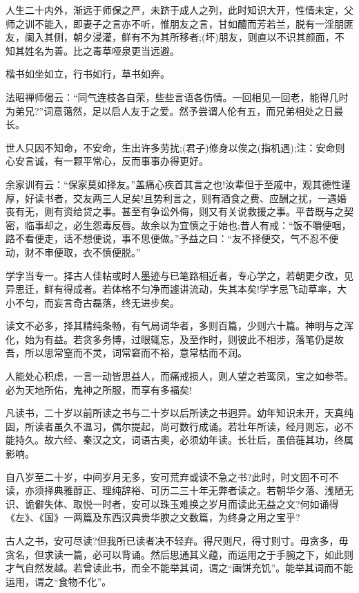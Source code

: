 \documentclass[letterpaper,10pt,english]{sphinxmanual}
\begin{document}
人生二十内外，渐远于师保之严，未跻于成人之列，此时知识大开，性情未定，父师之训不能入，即妻子之言亦不听，惟朋友之言，甘如醴而芳若兰，脱有一淫朋匪友，阑入其侧，朝夕浸灌，鲜有不为其所移者;(坏)朋友，则直以不识其颜面，不知其姓名为善。比之毒草哑泉更当远避。

楷书如坐如立，行书如行，草书如奔。

法昭禅师偈云：“同气连枝各自荣，些些言语各伤情。一回相见一回老，能得几时为弟兄?”词意蔼然，足以启人友于之爱。然予尝谓人伦有五，而兄弟相处之日最长。

世人只因不知命，不安命，生出许多劳扰;(君子)修身以俟之(指机遇);注：安命则心安言诚，有一颗平常心，反而事事办得更好。

余家训有云：“保家莫如择友。”盖痛心疾首其言之也!汝辈但于至戚中，观其德性谨厚，好读书者，交友两三人足矣!且势利言之，则有酒食之费、应酬之扰，一遇婚丧有无，则有资给贷之事。甚至有争讼外侮，则又有关说救援之事。平昔既与之契密，临事却之，必生怨毒反唇。故余以为宜慎之于始也;昔人有戒：“饭不嚼便咽，路不看便走，话不想便说，事不思便做。”予益之曰：“友不择便交，气不忍不便动，财不审便取，衣不慎便脱。”

学字当专一。择古人佳帖或时人墨迹与已笔路相近者，专心学之，若朝更夕改，见异思迁，鲜有得成者。若体格不匀净而遽讲流动，失其本矣!学字忌飞动草率，大小不匀，而妄言奇古磊落，终无进步矣。

读文不必多，择其精纯条畅，有气局词华者，多则百篇，少则六十篇。神明与之浑化，始为有益。若贪多务博，过眼辄忘，及至作时，则彼此不相涉，落笔仍是故吾，所以思常窒而不灵，词常窘而不裕，意常枯而不润。

人能处心积虑，一言一动皆思益人，而痛戒损人，则人望之若鸾凤，宝之如参苓。必为天地所佑，鬼神之所服，而享有多福矣!

凡读书，二十岁以前所读之书与二十岁以后所读之书迥异。幼年知识未开，天真纯固，所读者虽久不温习，偶尔提起，尚可数行成诵。若壮年所读，经月则忘，必不能持久。故六经、秦汉之文，词语古奥，必须幼年读。长壮后，虽倍蓰其功，终属影响。

自八岁至二十岁，中间岁月无多，安可荒弃或读不急之书?此时，时文固不可不读，亦须择典雅醇正、理纯辞裕、可历二三十年无弊者读之。若朝华夕落、浅陋无识、诡僻失体、取悦一时者，安可以珠玉难换之岁月而读此无益之文?何如诵得《左》、《国》一两篇及东西汉典贵华腴之文数篇，为终身之用之宝乎?

古人之书，安可尽读?但我所已读者决不轻弃。得尺则尺，得寸则寸。毋贪多，毋贪名，但求读一篇，必可以背诵。然后思通其义蕴，而运用之于手腕之下，如此则才气自然发越。若曾读此书，而全不能举其词，谓之“画饼充饥”。能举其词而不能运用，谓之“食物不化”。
\end{document}
